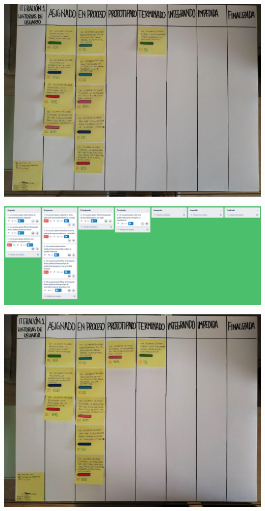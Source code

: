 \documentclass[spanish]{beamer}
\begin{document}
\begin{frame}
	\begin{center}
		\includegraphics[angle=90, scale=0.34]{papel1_4}
	\end{center}
\end{frame}

\begin{frame}
	\begin{center}
		\includegraphics[scale=0.24]{trello1_5}
	\end{center}
\end{frame}

\begin{frame}
	\begin{center}
		\includegraphics[angle=90, scale=0.335]{papel1_5}
	\end{center}
\end{frame}
\end{document}
